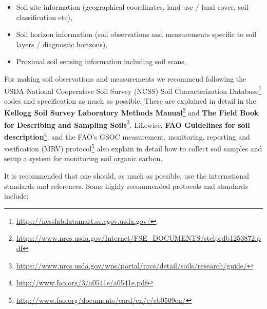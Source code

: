 \documentclass[
  graybox,natbib,nospthms]{svmono}
\providecommand{\tightlist}{%
  \setlength{\itemsep}{0pt}\setlength{\parskip}{0pt}}
\providecommand{\tightlist}{\setlength{\itemsep}{0pt}\setlength{\parskip}{0pt}}
\renewcommand{\href}[2]{#2 (\url{#1})}
\renewcommand{\href}[2]{#2\footnote{\url{#1}}}
\begin{document}
\begin{itemize}
\tightlist
\item
  Soil site information (geographical coordinates, land use / land cover, soil classification etc),
\item
  Soil horizon information (soil observations and measurements specific to soil layers / diagnostic horizons),
\item
  Proximal soil sensing information including soil scans,
\end{itemize}

For making soil observations and measurements we recommend following the USDA \href{https://ncsslabdatamart.sc.egov.usda.gov/}{National Cooperative Soil Survey (NCSS) Soil
Characterization Database} codes and specification as much as possible. These are explained in detail in the \href{https://www.nrcs.usda.gov/Internet/FSE_DOCUMENTS/stelprdb1253872.pdf}{\textbf{Kellogg Soil Survey Laboratory Methods Manual}}
and \href{https://www.nrcs.usda.gov/wps/portal/nrcs/detail/soils/research/guide/}{\textbf{The Field Book for Describing and Sampling Soils}}.
Likewise, \href{http://www.fao.org/3/a0541e/a0541e.pdf}{\textbf{FAO Guidelines for soil description}},
and the FAO's \href{http://www.fao.org/documents/card/en/c/cb0509en/}{GSOC measurement, monitoring, reporting and verification (MRV) protocol} also explain in
detail how to collect soil samples and setup a system for monitoring soil organic carbon.

It is recommended that one should, as much as possible, use the international standards
and references. Some highly recommended protocols and standards include:
\end{document}

